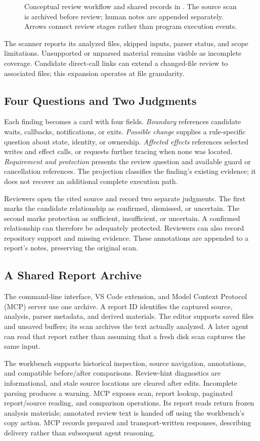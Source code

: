 \begin{figure}[t]
\centering

\caption{Conceptual review workflow and shared records in \tool{}. The source scan is archived before review; human notes are appended separately. Arrows connect review stages rather than program execution events.}
\label{fig:architecture}
\end{figure}

The scanner reports its analyzed files, skipped inputs, parser status, and scope limitations. Unsupported or unparsed material remains visible as incomplete coverage. Candidate direct-call links can extend a changed-file review to associated files; this expansion operates at file granularity.

\subsection{Four Questions and Two Judgments}
Each finding becomes a card with four fields. \emph{Boundary} references candidate waits, callbacks, notifications, or exits. \emph{Possible change} supplies a rule-specific question about state, identity, or ownership. \emph{Affected effects} references selected writes and effect calls, or requests further tracing when none was located. \emph{Requirement and protection} presents the review question and available guard or cancellation references. The projection classifies the finding's existing evidence; it does not recover an additional complete execution path.

Reviewers open the cited source and record two separate judgments. The first marks the candidate relationship as confirmed, dismissed, or uncertain. The second marks protection as sufficient, insufficient, or uncertain. A confirmed relationship can therefore be adequately protected. Reviewers can also record repository support and missing evidence. These annotations are appended to a report's notes, preserving the original scan.

\subsection{A Shared Report Archive}
The command-line interface, VS Code extension, and Model Context Protocol (MCP) server use one archive. A report ID identifies the captured source, analysis, parser metadata, and derived materials. The editor supports saved files and unsaved buffers; its scan archives the text actually analyzed. A later agent can read that report rather than assuming that a fresh disk scan captures the same input.

The workbench supports historical inspection, source navigation, annotations, and compatible before/after comparisons. Review-hint diagnostics are informational, and stale source locations are cleared after edits. Incomplete parsing produces a warning. MCP exposes scan, report lookup, paginated report/source reading, and comparison operations. Its report reads return frozen analysis materials; annotated review text is handed off using the workbench's copy action. MCP records prepared and transport-written responses, describing delivery rather than subsequent agent reasoning.
